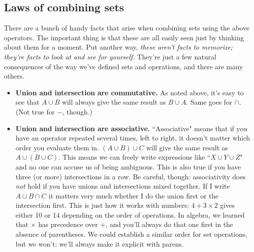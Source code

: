 \subsection{Laws of combining sets}

There are a bunch of handy facts that arise when combining sets using the
above operators. The important thing is that these are all easily seen just
by thinking about them for a moment. Put another way, \textit{these aren't
facts to memorize; they're facts to look at and see for yourself.} They're
just a few natural consequences of the way we've defined sets and
operations, and there are many others.

\begin{itemize}

\item \textbf{Union and intersection are commutative.} 
As noted above, it's easy to see that $A \cup B$ will always give the same
result as $B \cup A$.  Same goes for $\cap$. (Not true for $-$, though.)

\item \textbf{Union and intersection are associative.} 
``Associative" means that if you have an operator repeated several times,
left to right, it doesn't matter which order you evaluate them in. $(A \cup
B) \cup C$ will give the same result as $A \cup (B \cup C)$. This means we
can freely write expressions like ``$X \cup Y \cup Z$" and no one can
accuse us of being ambiguous. This is also true if you have three (or more)
intersections in a row. Be careful, though: associativity does \textit{not}
hold if you have unions and intersections mixed together. If I write $A
\cup B \cap C$ it matters very much whether I do the union first or the
intersection first. This is just how it works with numbers: $4 + 3 \times
2$ gives either 10 or 14 depending on the order of operations. In algebra,
we learned that $\times$ has precedence over +, and you'll always do that
one first in the absence of parentheses. We could establish a similar order
for set operations, but we won't: we'll always make it explicit with
parens.


\end{itemize}
